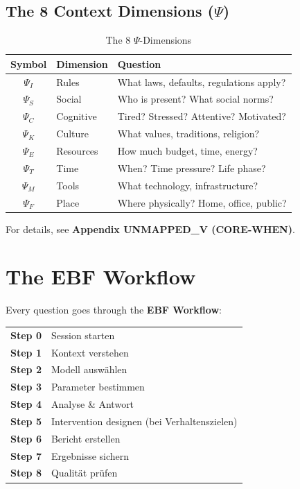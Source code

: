 \subsection{The 8 Context Dimensions ($\Psi$)}

\begin{table}[htbp]
\centering
\caption{The 8 $\Psi$-Dimensions}
\label{tab:psi-dimensions}
\renewcommand{\arraystretch}{1.3}
\begin{tabular}{@{}cll@{}}
\toprule
\textbf{Symbol} & \textbf{Dimension} & \textbf{Question} \\
\midrule
$\Psi_I$ & Rules & What laws, defaults, regulations apply? \\
$\Psi_S$ & Social & Who is present? What social norms? \\
$\Psi_C$ & Cognitive & Tired? Stressed? Attentive? Motivated? \\
$\Psi_K$ & Culture & What values, traditions, religion? \\
$\Psi_E$ & Resources & How much budget, time, energy? \\
$\Psi_T$ & Time & When? Time pressure? Life phase? \\
$\Psi_M$ & Tools & What technology, infrastructure? \\
$\Psi_F$ & Place & Where physically? Home, office, public? \\
\bottomrule
\end{tabular}
\end{table}

For details, see \textbf{Appendix UNMAPPED_V (CORE-WHEN)}.


\section{The EBF Workflow}
\label{sec:ref-ebf-workflow}

Every question goes through the \textbf{EBF Workflow}:

\begin{tcolorbox}[colback=gray!5!white, colframe=gray!75!black,
    title=The EBF Workflow: 8 Steps]

\begin{tabular}{@{}rl@{}}
\textbf{Step 0} & Session starten \\
\textbf{Step 1} & Kontext verstehen \\
\textbf{Step 2} & Modell auswählen \\
\textbf{Step 3} & Parameter bestimmen \\
\textbf{Step 4} & Analyse \& Antwort \\
\textbf{Step 5} & Intervention designen (bei Verhaltenszielen) \\
\textbf{Step 6} & Bericht erstellen \\
\textbf{Step 7} & Ergebnisse sichern \\
\textbf{Step 8} & Qualität prüfen \\
\end{tabular}

\end{tcolorbox}

